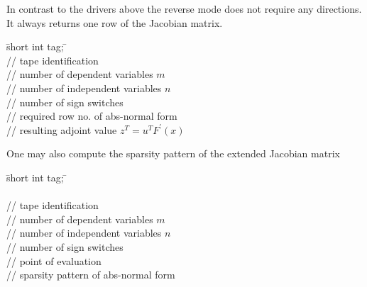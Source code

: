 In contrast to the drivers above the reverse mode does not require any directions. 
It always returns one row of the Jacobian matrix.

\begin{tabbing}
\hspace{0.5in}\={\sf short int tag;} \hspace{1.1in}\= \kill    %
\\
         \> // tape identification \\
                 \> // number of dependent variables $m$\\
                 \> // number of independent variables $n$\\
                 \> // number of sign switches\\
            \> // required row no. of abs-normal form \\
           \> // resulting adjoint value $z^T = u^T F^\prime (x)$\\
\end{tabbing}

One may also compute the sparsity pattern of the extended Jacobian
matrix 

\begin{tabbing}
\hspace{0.5in}\={\sf short int tag;} \hspace{1.1in}\= \kill    %
 \>\phantom{something}\\
\\
         \> // tape identification \\
                 \> // number of dependent variables $m$\\
                 \> // number of independent variables $n$\\
                 \> // number of sign switches\\
       \> // point of evaluation\\     
     \> // sparsity pattern of abs-normal form \\
\end{tabbing}
